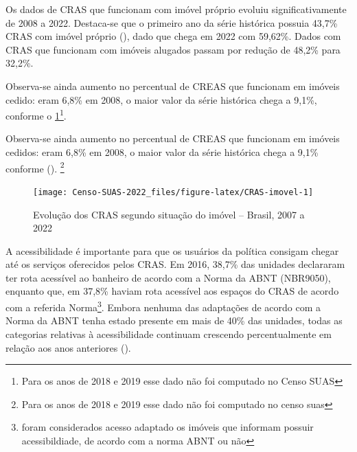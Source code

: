 \documentclass[
  brazilian]{report}
\begin{document}
Os dados de CRAS que funcionam com imóvel próprio evoluiu
significativamente de 2008 a 2022. Destaca-se que o primeiro ano da
série histórica possuia 43,7\% CRAS com imóvel próprio
(), dado que chega em 2022 com 59,62\%. Dados com
CRAS que funcionam com imóveis alugados passam por redução de 48,2\%
para 32,2\%.

Observa-se ainda aumento no percentual de CREAS que funcionam em imóveis
cedido: eram 6,8\% em 2008, o maior valor da série histórica chega a
9,1\%, conforme o
\cref{fig:CRAS-imovel}\footnote{Para os anos de 2018 e 2019 esse dado não foi computado no Censo SUAS}.

Observa-se ainda aumento no percentual de CREAS que funcionam em imóveis
cedidos: eram 6,8\% em 2008, o maior valor da série histórica chega a
9,1\% conforme ().
\footnote{Para os anos de 2018 e 2019 esse dado não foi computado no censo suas}

\begin{figure}
\texttt{[image: Censo-SUAS-2022\_files/figure-latex/CRAS-imovel-1]} \caption[Evolução dos CRAS segundo situação do imóvel – Brasil, 2007 a 2022]{Evolução dos CRAS segundo situação do imóvel – Brasil, 2007 a 2022}\label{fig:CRAS-imovel}
\end{figure}

A acessibilidade é importante para que os usuários da política consigam
chegar até os serviços oferecidos pelos CRAS. Em 2016, 38,7\% das
unidades declararam ter rota acessível ao banheiro de acordo com a Norma
da ABNT (NBR9050), enquanto que, em 37,8\% haviam rota acessível aos
espaços do CRAS de acordo com a referida
Norma\footnote{foram considerados acesso adaptado os imóveis que informam possuir acessibildiade, de acordo com a norma ABNT ou não}.
Embora nenhuma das adaptações de acordo com a Norma da ABNT tenha estado
presente em mais de 40\% das unidades, todas as categorias relativas à
acessibilidade continuam crescendo percentualmente em relação aos anos
anteriores ().
\end{document}
